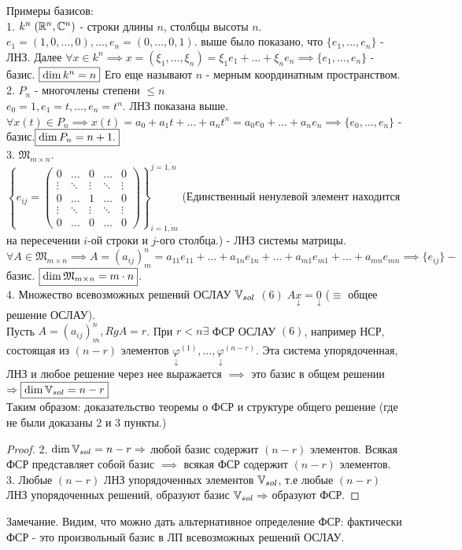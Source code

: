 \documentclass[../main.tex]{subfiles}
\begin{document}
Примеры базисов:
\\1. $k^{n} \;(\mathbb{R}^{n}, \mathbb{C}^{n})$ - строки длины $n$, столбцы высоты $n$.
\\$e_{1} = (1, 0,\dots,0) ,\dots, e_{n} = (0,\dots,0,1)$. выше было показано, что $\{e_{1},\dots,e_{n}\}$ - ЛНЗ. Далее $\forall x \in k^{n}\implies x= (\xi_{1},\dots,\xi_{n})=\xi_{1}e_{1}+\dots+\xi_{n}e_{n}\implies \{e_{1},\dots,e_{n}\}$ - базис. $\fbox{$\dim k^{n}=n$}$ 
Его еще называют $n$ - мерным координатным пространством. 
\\2. $P_{n}$ - многочлены степени $\leqslant n$
\\$e_{0}=1,e_{1}=t ,\dots, e_{n}=t^{n}$. ЛНЗ показана выше. $\forall x(t)\in P_{n}\implies x(t)=a_{0}+a_{1}t+\dots+a_{n}t^{n}=a_{0}e_{0}+\dots+a_{n}e_{n}\implies \{e_{0},\dots,e_{n}\}$ - базис.$ \fbox{$\dim P_{n}=n+1. $}$
\\3. $\mathfrak{M}_{m\times n}$. 
\\$\left\{e_{ij}= \begin{pmatrix}
    0& \dots & 0 & \dots &0\\ 
    \vdots & \ddots & \vdots & \ddots & \vdots\\
    0& \dots & 1 & \dots & 0 \\ 
    \vdots & \ddots & \vdots & \ddots & \vdots \\
    0& \dots & 0 & \dots & 0
\end{pmatrix}\right\}_{i=\overline{1,m}}^{j=\overline{1,n}}$ (Единственный ненулевой элемент находится на пересечении $i$-ой строки и $j$-ого столбца.) - ЛНЗ системы матрицы. $\forall A \in \mathfrak{M}_{m\times n}\implies A =(a_{ij})_{m}^{n} = a_{11}e_{11}+\dots+a_{1n}e_{1n}+\dots+a_{m1}e_{m1}+\dots+a_{mn}e_{mn}\implies \{e_{ij}\} - $ базис. $\fbox{$\dim \mathfrak{M}_{m\times n} = m\cdot n$}$.
\\4. Множество всевозможных решений ОСЛАУ $\mathbb{V}_{sol}$ $(6) \; A\underset{\downarrow}{x}=\underset{\downarrow}{0}$ \quad ($\equiv$ общее решение ОСЛАУ). 
\\Пусть $A= (a_{ij})_{m}^{n}, RgA=r$. При $r<n \exists $ ФСР ОСЛАУ $(6)$, например НСР, состоящая из $(n-r)$ элементов $\underset{\downarrow}{\varphi}^{(1)},\dots,\underset{\downarrow}{\varphi}^{(n-r)}$. Эта система упорядоченная, ЛНЗ и любое решение через нее выражается $\implies$ это базис в общем решении $\Rightarrow \fbox{$\dim\mathbb{V}_{sol}=n-r$}$  
\\Таким образом: доказательство теоремы о ФСР и структуре общего решение (где не были доказаны 2 и 3 пункты.)
\begin{proof}
    2. $\dim \mathbb{V}_{sol}=n-r \Rightarrow $ любой базис содержит $(n-r)$ элементов. Всякая ФСР представляет собой базис $\implies$ всякая ФСР содержит $(n-r)$ элементов. 
    \\3. Любые $(n-r)$ ЛНЗ упорядоченных элементов $\mathbb{V}_{sol}$, т.е любые $(n-r)$ ЛНЗ упорядоченных решений, образуют базис $\mathbb{V}_{sol}\Rightarrow $ образуют ФСР. 
\end{proof}
Замечание. Видим, что можно дать альтернативное определение ФСР: фактически ФСР - это произвольный базис в ЛП всевозможных решений ОСЛАУ. 
\end{document}
